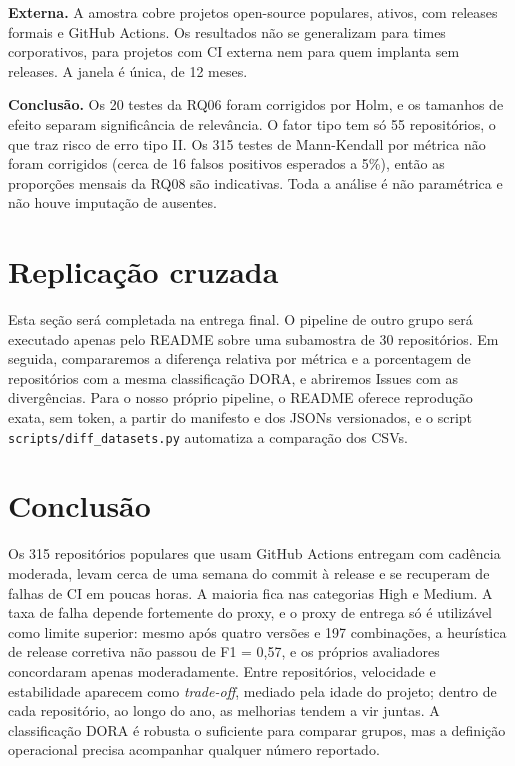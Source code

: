 \documentclass[12pt]{article}
\newcommand{\code}[1]{\texttt{\small #1}}
\begin{document}
\textbf{Externa.} A amostra cobre projetos open-source populares, ativos, com
releases formais e GitHub Actions. Os resultados não se generalizam para
times corporativos, para projetos com CI externa nem para quem implanta sem
releases. A janela é única, de 12 meses.

\textbf{Conclusão.} Os 20 testes da RQ06 foram corrigidos por Holm, e os
tamanhos de efeito separam significância de relevância. O fator tipo tem só
55 repositórios, o que traz risco de erro tipo II. Os 315 testes de
Mann-Kendall por métrica não foram corrigidos (cerca de 16 falsos positivos
esperados a 5\%), então as proporções mensais da RQ08 são indicativas. Toda a
análise é não paramétrica e não houve imputação de ausentes.

\section{Replicação cruzada}

Esta seção será completada na entrega final. O pipeline de outro grupo será
executado apenas pelo README sobre uma subamostra de 30 repositórios. Em
seguida, compararemos a diferença relativa por métrica e a porcentagem de
repositórios com a mesma classificação DORA, e abriremos Issues com as
divergências. Para o nosso próprio pipeline, o README oferece reprodução
exata, sem token, a partir do manifesto e dos JSONs versionados, e o script
\code{scripts/diff\_datasets.py} automatiza a comparação dos CSVs.

\section{Conclusão}

Os 315 repositórios populares que usam GitHub Actions entregam com cadência
moderada, levam cerca de uma semana do commit à release e se recuperam de
falhas de CI em poucas horas. A maioria fica nas categorias High e Medium. A
taxa de falha depende fortemente do proxy, e o proxy de entrega só é
utilizável como limite superior: mesmo após quatro versões e 197
combinações, a heurística de release corretiva não passou de F1 = 0,57, e os
próprios avaliadores concordaram apenas moderadamente. Entre repositórios,
velocidade e estabilidade aparecem como \emph{trade-off}, mediado pela idade
do projeto; dentro de cada repositório, ao longo do ano, as melhorias tendem
a vir juntas. A classificação DORA é robusta o suficiente para comparar
grupos, mas a definição operacional precisa acompanhar qualquer número
reportado.
\end{document}
